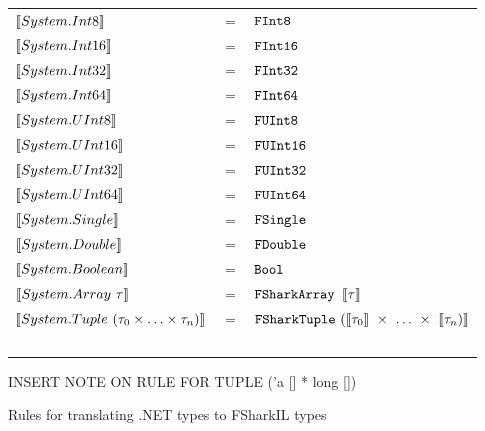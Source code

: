 \begin{figure}
  \centering
\begin{tabular}{@{}l c l}%
  $\llbracket System.Int8 \rrbracket$ & $=$ & $\text{\ttfamily FInt8} $ \\ 
  $\llbracket System.Int16 \rrbracket$ & $=$ & $\text{\ttfamily FInt16}$
  \\
  $\llbracket System.Int32 \rrbracket$ & $=$ & $\text{\ttfamily FInt32} $ \\ 
  $\llbracket System.Int64 \rrbracket$ & $=$ & $\text{\ttfamily FInt64} $
  \\
  $\llbracket System.UInt8 \rrbracket$ & $=$ & $\text{\ttfamily FUInt8} $ \\ 
  $\llbracket System.UInt16 \rrbracket$ & $=$ & $\text{\ttfamily FUInt16} $ 
  \\
  $\llbracket System.UInt32 \rrbracket$ & $=$ & $\text{\ttfamily FUInt32} $ \\ 
  $\llbracket System.UInt64 \rrbracket$ & $=$ & $\text{\ttfamily FUInt64} $ 
  \\
  $\llbracket System.Single \rrbracket$ & $=$ & $\text{\ttfamily FSingle} $ \\ 
  $\llbracket System.Double \rrbracket$ & $=$ & $\text{\ttfamily FDouble} $ 
  \\
  $\llbracket System.Boolean \rrbracket$ & $=$ & $\text{\ttfamily Bool} $ \\ 
  $\llbracket System.Array~\tau \rrbracket$ & $=$ & $\text{\ttfamily {\texttt{FShark}}{}Array }\llbracket \tau \rrbracket$
  \\
  $\llbracket System.Tuple~(\tau_0 \times \ldots \times \tau_n) \rrbracket$ & $=$ & $\text{\ttfamily {\texttt{FShark}}{}Tuple}~(\llbracket \tau_0 \rrbracket~\times~\ldots~\times~\llbracket \tau_n) \rrbracket$ \\ ~ \\
\end{tabular}

INSERT NOTE ON RULE FOR TUPLE ('a [] * long [])

\caption{Rules for translating .NET types to FSharkIL types}
\end{figure}

